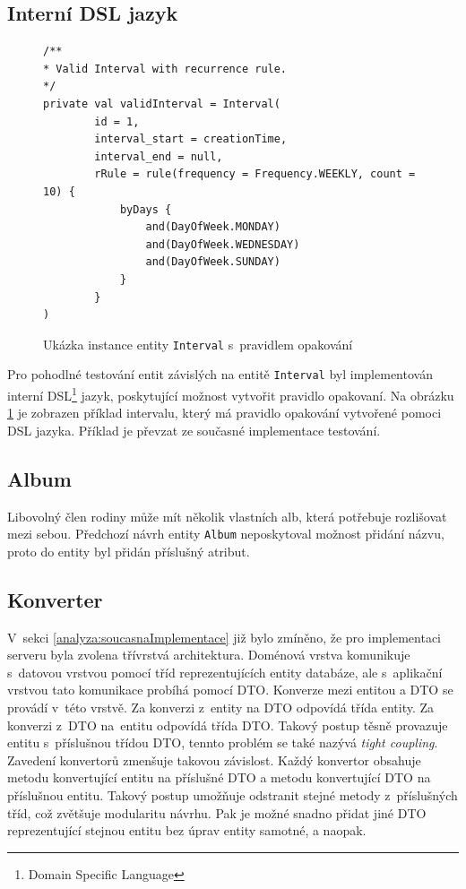     \subsection{Interní DSL jazyk}\label{navrh:zmeny:dsl}
        \begin{figure}
            \begin{verbatim}
/**
* Valid Interval with recurrence rule.
*/
private val validInterval = Interval(
        id = 1,
        interval_start = creationTime,
        interval_end = null,
        rRule = rule(frequency = Frequency.WEEKLY, count = 10) {
            byDays {
                and(DayOfWeek.MONDAY)
                and(DayOfWeek.WEDNESDAY)
                and(DayOfWeek.SUNDAY)
            }
        }
)
            \end{verbatim}
            \caption{Ukázka instance entity \texttt{Interval} s~pravidlem opakování} 
            \label{code:valid-interval}
        \end{figure}
        Pro pohodlné testování entit závislých na entitě \verb|Interval| byl implementován interní DSL\footnote{Domain Specific Language} jazyk, poskytující možnost vytvořit pravidlo opakovaní. Na obrázku \ref{code:valid-interval} je zobrazen příklad intervalu, který má pravidlo opakování vytvořené pomoci DSL jazyka. Příklad je převzat ze současné implementace testování.

    \subsection{Album}
        Libovolný člen rodiny může mít několik vlastních alb, která potřebuje rozlišovat mezi sebou. Předchozí návrh entity \verb|Album| neposkytoval možnost přidání názvu, proto do entity byl přidán příslušný atribut.
        
    \subsection{Konverter}
        V~sekci \ref{analyza:soucasnaImplementace} již bylo zmíněno, že pro implementaci serveru byla zvolena třívrstvá architektura. Doménová vrstva komunikuje s~datovou vrstvou pomocí tříd reprezentujících entity databáze, ale s~aplikační vrstvou tato komunikace probíhá pomocí DTO. Konverze mezi entitou a DTO se provádí v~této vrstvě. Za konverzi z~entity na DTO odpovídá třída entity. Za konverzi z~DTO na~entitu odpovídá třída DTO.
        Takový postup těsně provazuje entitu s~příslušnou třídou DTO, tennto problém se také nazývá \textit{tight coupling}. Zavedení konvertorů zmenšuje takovou závislost. Každý konvertor obsahuje metodu konvertující entitu na příslušné DTO a metodu konvertující DTO na příslušnou entitu. Takový postup umožňuje odstranit stejné metody z~příslušných tříd, což zvětšuje modularitu návrhu. 
        Pak je možné snadno přidat jiné DTO reprezentující stejnou entitu bez úprav entity samotné, a naopak.
        
